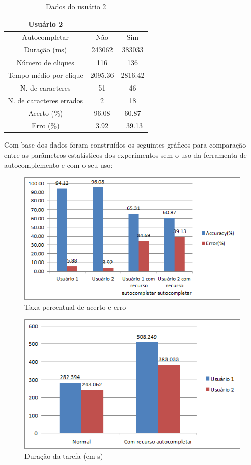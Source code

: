 \documentclass[twoside]{article}
\begin{document}
\begin{multicols}{2}
\begin{table}[H]
\caption{Dados do usuário 2}
\centering
\begin{tabular}{ccc}
\toprule
 Usuário 2 &  & \\
\midrule
Autocompletar & Não & Sim\\
Duração (ms) & 243062 & 383033\\
Número de cliques & 116 & 136\\
Tempo médio por clique & 2095.36 & 2816.42\\
N. de caracteres & 51 & 46\\
N. de caracteres errados & 2 & 18\\
Acerto (\%) & 96.08 & 60.87\\
Erro (\%) & 3.92 &\ 39.13\\
\bottomrule
\end{tabular}
\end{table}

\noindent Com base dos dados foram construídos os seguintes gráficos para comparação entre as parâmetros estatísticos dos experimentos sem o uso da ferramenta de autocomplemento e com o seu uso:

\begin{figure}[H]
\label{fig:graph_tx}
  \caption{Taxa percentual de acerto e erro}
  \centering
    \includegraphics[scale = 0.50]{graph_acertoerro.png}
\end{figure}

\begin{figure}[H]
\label{fig:graph_d}
  \caption{Duração da tarefa (em s)}
  \centering
    \includegraphics[scale = 0.50]{graph_duracao.png}
\end{figure}


\end{multicols}
\end{document}
